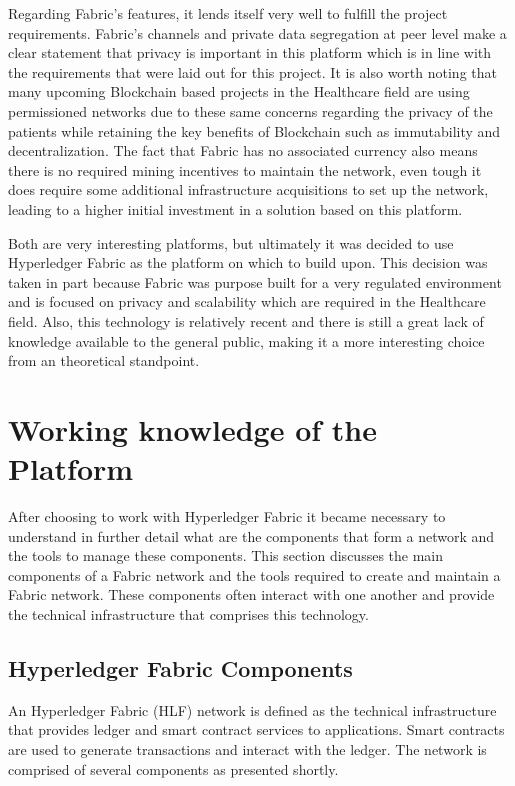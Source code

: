 Regarding Fabric's features, it lends itself very well to fulfill the project
requirements. Fabric's channels and private data segregation at peer level make
a clear statement that privacy is important in this platform which is in line
with the requirements that were laid out for this project. It is also worth
noting that many upcoming Blockchain based projects in the Healthcare field are
using permissioned networks due to these same concerns regarding the privacy of
the patients while retaining the key benefits of Blockchain such as
immutability and decentralization. The fact that Fabric has no associated
currency also means there is no required mining incentives to maintain the
network, even tough it does require some additional infrastructure acquisitions
to set up the network, leading to a higher initial investment in a solution
based on this platform.

Both are very interesting platforms, but ultimately it was decided to use
Hyperledger Fabric as the platform on which to build upon. This decision was
taken in part because Fabric was purpose built for a very regulated environment
and is focused on privacy and scalability which are required in the Healthcare
field. Also, this technology is relatively recent and there is still a great
lack of knowledge available to the general public, making it a more interesting
choice from an theoretical standpoint.

\section{Working knowledge of the Platform}

After choosing to work with Hyperledger Fabric it became necessary to
understand in further detail what are the components that form a network and
the tools to manage these components. This section discusses the main
components of a Fabric network and the tools required to create and maintain a
Fabric network. These components often interact with one another and provide
the technical infrastructure that comprises this technology.

\subsection{Hyperledger Fabric Components}

An Hyperledger Fabric (HLF) network is defined as the technical infrastructure
that provides ledger and smart contract services to applications. Smart
contracts are used to generate transactions and interact with the ledger. The
network is comprised of several components as presented shortly.

